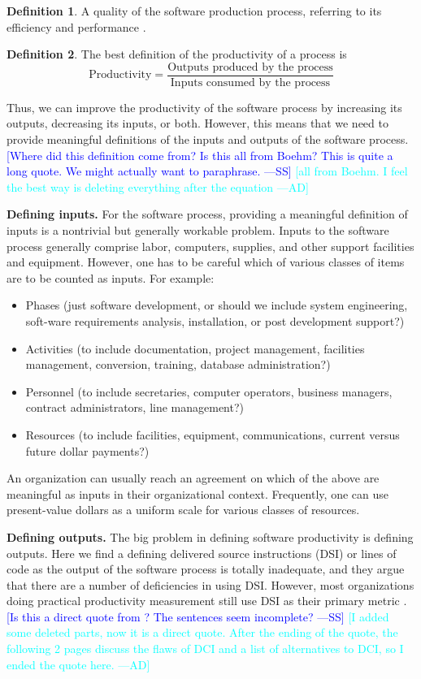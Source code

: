 \documentclass[letterpaper,cleveref]{lipics-v2019}
\newcommand{\authornote}[3]{\textcolor{#1}{[#3 ---#2]}}
\newcommand{\authornote}[3]{}
\newcommand{\wss}[1]{\authornote{blue}{SS}{#1}} %
\newcommand{\ad}[1]{\authornote{cyan}{AD}{#1}} %
\theoremstyle{definition}
\newtheorem{defn}{Definition}
\begin{document}
\begin{defn}
  A quality of the software production process, referring to its efficiency and
  performance \citep{ghezzi1991fundamentals}.
\end{defn}
\begin{defn}
  The best definition of the productivity of a process is
	\[\text{Productivity} = \dfrac{\text{Outputs produced by the
              process}}{\text{Inputs consumed by the process}}\]

Thus, we can improve the productivity of the software process by increasing its
outputs, decreasing its inputs, or both. However, this means that we need to
provide meaningful definitions of the inputs and outputs of the software
process. \wss{Where did this definition come from?  Is this all from Boehm?
  This is quite a long quote.  We might actually want to paraphrase.}
\ad{all from Boehm. I feel the best way is deleting everything after the 
equation}

\textbf{Defining inputs.} For the software process, providing a meaningful
definition of inputs is a nontrivial but generally workable problem. Inputs to
the software process generally comprise labor, computers, supplies, and other
support facilities and equipment. However, one has to be careful which of
various classes of items are to be counted as inputs. For example:
\begin{itemize}
\item Phases (just software development, or should we include system
engineering, soft-ware requirements analysis, installation, or post development
support?)
\item Activities (to include documentation, project management, facilities
management, conversion, training, database administration?)
\item Personnel (to include secretaries, computer operators, business managers,
contract administrators, line management?)
\item Resources (to include facilities, equipment, communications, current
versus future dollar payments?)
\end{itemize}
An organization can usually reach an agreement on which of the above are
meaningful as inputs in their organizational context. Frequently, one can use
present-value dollars as a uniform scale for various classes of resources.

\textbf{Defining outputs.} The big problem in defining software productivity is
defining outputs. Here we find a defining delivered source instructions (DSI) or
lines of code as the output of the software process is totally inadequate, and
they argue that there are a number of deficiencies in using DSI. However,
	most organizations doing practical productivity measurement still use DSI as
	their primary metric \citep{Boehm1987}. \wss{Is this a direct quote from
		\citet{Boehm1987}?  The sentences seem incomplete?}
\ad{I added some deleted parts, now it is a direct quote. After the ending of
the quote, the following 2 pages discuss the flaws of DCI and a list of
alternatives to DCI, so I ended the quote here.}
\end{defn}
\end{document}
